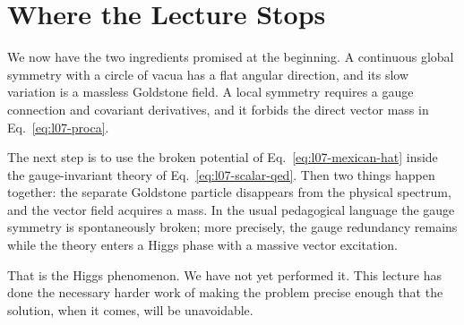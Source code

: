 \begin{classroomqa}
\end{classroomqa}

\section{Where the Lecture Stops}

We now have the two ingredients promised at the beginning. A continuous
global symmetry with a circle of vacua has a flat angular direction, and its
slow variation is a massless Goldstone field. A local symmetry requires a
gauge connection and covariant derivatives, and it forbids the direct vector
mass in Eq.~\eqref{eq:l07-proca}.

The next step is to use the broken potential of
Eq.~\eqref{eq:l07-mexican-hat} inside the gauge-invariant theory of
Eq.~\eqref{eq:l07-scalar-qed}. Then two things happen together: the separate
Goldstone particle disappears from the physical spectrum, and the vector
field acquires a mass. In the usual pedagogical language the gauge symmetry
is spontaneously broken; more precisely, the gauge redundancy remains while
the theory enters a Higgs phase with a massive vector excitation.

That is the Higgs phenomenon. We have not yet performed it. This lecture has
done the necessary harder work of making the problem precise enough that the
solution, when it comes, will be unavoidable.
